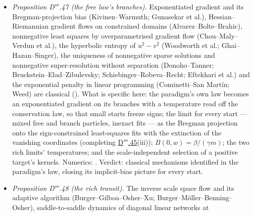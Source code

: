 \begin{itemize}
    al.; Bodson et al.; Sastry--Bodson), the LASSO and its irrepresentable condition (Tibshirani; Zhao--Yu; Wainwright)
    and mirror-descent adaptation laws (Boffi--Slotine) (\cite{S73}). What is specific here: the leak realised on the
    paradigm's $(\alpha,\beta)$ law with the conservation law kept, its ultimate bound in the adaptive loop with this law,
    the averaged equilibrium with the error filter's Gram as a monotone equation for this law, and the starting masses
    setting the regime --- a ridge, or a LASSO with penalty $\sigma\lambda_1\propto\sigma/\sqrt{\beta^0}$ that keeps the
    target's kernels under the irrepresentable condition. Numerics: . Verdict: classical
    ingredients assembled into a robust version of the paradigm's mass law, whose small-start limit selects the target's
    kernels under the (weighted) irrepresentable condition.
  \item \emph{Proposition D$'''$.47 (the free law's branches).} Exponentiated gradient and its Bregman-projection bias
    (Kivinen--Warmuth; Gunasekar et al.), Hessian--Riemannian gradient flows on constrained domains
    (Alvarez--Bolte--Brahic), nonnegative least squares by overparametrised gradient flow (Chou--Maly--Verdun et al.),
    the hyperbolic entropy of $u^2 - v^2$ (Woodworth et al.; Ghai--Hazan--Singer), the uniqueness of nonnegative sparse
    solutions and nonnegative super-resolution without separation (Donoho--Tanner; Bruckstein--Elad--Zibulevsky;
    Schiebinger--Robeva--Recht; Eftekhari et al.) and the exponential penalty in linear programming (Cominetti--San
    Mart\'in; Weed) are classical (\cite{S74}). What is specific here: the paradigm's own law becomes an exponentiated
    gradient on its branches with a temperature read off the conservation law, so that small starts freeze signs; the
    limit for every start --- mixed free and branch particles, inexact fits --- as the Bregman projection onto the
    sign-constrained least-squares fits with the extinction of the vanishing coordinates (completing
    \hyperref[res:thmDppp:45]{D$'''$.45}(iii)); $B(0,w) = \beta/(\gamma m)$; the two rich limits' temperatures; and the
    scale-independent selection of a positive target's kernels. Numerics: . Verdict: classical
    mechanisms identified in the paradigm's law, closing its implicit-bias picture for every start.
  \item \emph{Proposition D$'''$.48 (the rich transit).} The inverse scale space flow and its adaptive algorithm
    (Burger--Gilboa--Osher--Xu; Burger--M\"oller--Benning--Osher), saddle-to-saddle dynamics of diagonal linear networks at

\end{itemize}
